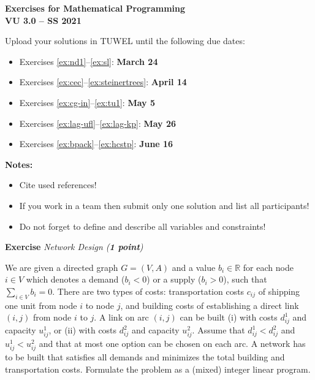 \documentclass[a4paper,10pt]{article}
\newcounter{exc}
\newenvironment{exercise}[1]%
{\refstepcounter{exc}\textbf{Exercise \arabic{exc}} \emph{#1}\\}
{

\hrulefill\medskip}%
\newcommand{\R}{\mathbb{R}}
\begin{document}
\begin{center}
  {\large \bf Exercises for Mathematical Programming \\
    VU 3.0 -- SS 2021}
\end{center}

\hrulefill\medskip

Upload your solutions in TUWEL until the following due dates:
\begin{itemize}
 \item Exercises \ref{ex:nd1}--\ref{ex:sl}: \textbf{March 24}
 \item Exercises \ref{ex:cec}--\ref{ex:steinertrees}: \textbf{April 14}
 \item Exercises \ref{ex:cg-in}--\ref{ex:tu1}: \textbf{May 5}
 \item Exercises \ref{ex:lag-ufl}--\ref{ex:lag-kp}: \textbf{May 26}
 \item Exercises \ref{ex:bpack}--\ref{ex:hcstp}: \textbf{June 16}
\end{itemize}

\textbf{Notes:}
\begin{itemize}
 \item Cite used references!
 \item If you work in a team then submit only one solution and list all participants!
 \item Do not forget to define and describe all variables and constraints!
\end{itemize}

\hrulefill\medskip

\begin{exercise}{Network Design (\textbf{1 point})}\label{ex:nd1}

We are given a directed graph $G=(V,A)$ and a value $b_i \in \R$ for each node $i\in V$ which denotes a demand ($b_i < 0$) or a supply ($b_i > 0$), such that $\sum_{i\in V} b_i=0$. 
There are two types of costs: transportation costs $c_{ij}$ of shipping one unit from node $i$ to node $j$, and building costs of establishing a direct link $(i,j)$ from node $i$ to $j$. 
A link on arc $(i,j)$ can be built (i) with costs $d_{ij}^1$ and capacity $u_{ij}^1$, or (ii) with costs $d_{ij}^2$ and capacity $u_{ij}^2$. Assume that $d_{ij}^1<d_{ij}^2$ and $u_{ij}^1<u_{ij}^2$ and that at most one option can be chosen on each arc. 
A network has to be built that satisfies all demands and minimizes the total building and transportation costs. Formulate the problem as a (mixed) integer linear program.
\end{exercise}
\end{document}
